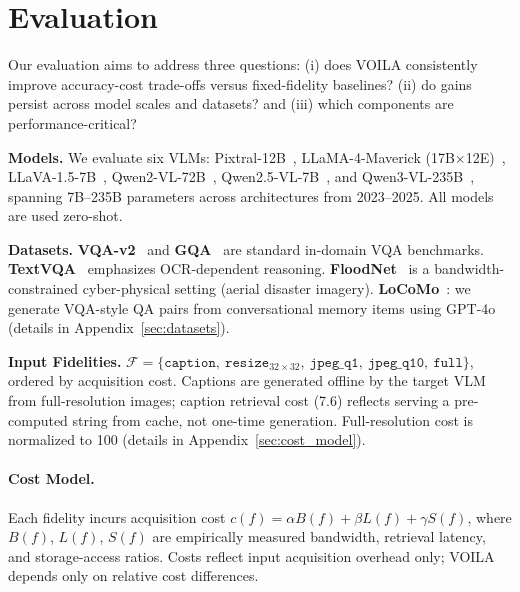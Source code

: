 \section{Evaluation}\label{sec:experiments}

Our evaluation aims to address three questions: (i) does \textsc{VOILA} consistently improve accuracy-cost trade-offs versus fixed-fidelity baselines? (ii) do gains persist across model scales and datasets? and (iii) which components are performance-critical?

\textbf{Models.} We evaluate six VLMs: Pixtral-12B~\cite{pixtral2024}, LLaMA-4-Maverick (17B$\times$12E)~\cite{abdullah2025evolutionmetasllamamodels}, LLaVA-1.5-7B~\cite{zhou2024tinyllava}, Qwen2-VL-72B~\cite{Qwen2VL}, Qwen2.5-VL-7B~\cite{Qwen2VL}, and Qwen3-VL-235B~\cite{bai2023qwen}, spanning 7B--235B parameters across architectures from 2023--2025. All models are used zero-shot.

\textbf{Datasets.}
\textbf{VQA-v2}~\cite{goyal2017vqav2} and \textbf{GQA}~\cite{hudson2019gqa} are standard in-domain VQA benchmarks.
\textbf{TextVQA}~\cite{singh2019textvqa} emphasizes OCR-dependent reasoning.
\textbf{FloodNet}~\cite{rahnemoonfar2021floodnet} is a bandwidth-constrained cyber-physical setting (aerial disaster imagery).
\textbf{LoCoMo}~\cite{wang2024locomo}: we generate VQA-style QA pairs from conversational memory items using GPT-4o (details in Appendix~\ref{sec:datasets}).

\textbf{Input Fidelities.}
$\mathcal{F}=\{\texttt{caption},\ \texttt{resize}_{32\times32},\ \texttt{jpeg\_q1},\ \texttt{jpeg\_q10},\ \texttt{full}\}$, ordered by acquisition cost. Captions are generated offline by the target VLM from full-resolution images; caption retrieval cost (7.6) reflects serving a pre-computed string from cache, not one-time generation. Full-resolution cost is normalized to 100 (details in Appendix~\ref{sec:cost_model}).

\paragraph{Cost Model.}
Each fidelity incurs acquisition cost $c(f) = \alpha B(f) + \beta L(f) + \gamma S(f)$, where $B(f)$, $L(f)$, $S(f)$ are empirically measured bandwidth, retrieval latency, and storage-access ratios. Costs reflect input acquisition overhead only; \textsc{VOILA} depends only on relative cost differences.

